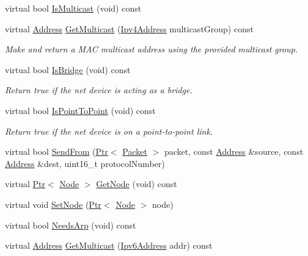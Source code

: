 \begin{DoxyCompactItemize}
virtual bool \hyperlink{classns3_1_1McUeNetDevice_a3459253818df16ee6af2ba49c28c525d}{Is\+Multicast} (void) const 
\item 
virtual \hyperlink{classns3_1_1Address}{Address} \hyperlink{classns3_1_1McUeNetDevice_a5f75b190a64d94f87f404367775e1373}{Get\+Multicast} (\hyperlink{classns3_1_1Ipv4Address}{Ipv4\+Address} multicast\+Group) const 
\begin{DoxyCompactList}\small\item\em Make and return a M\+AC multicast address using the provided multicast group. \end{DoxyCompactList}\item 
virtual bool \hyperlink{classns3_1_1McUeNetDevice_a333d93bc79e7c972dfb74ca88a7dd0ed}{Is\+Bridge} (void) const 
\begin{DoxyCompactList}\small\item\em Return true if the net device is acting as a bridge. \end{DoxyCompactList}\item 
virtual bool \hyperlink{classns3_1_1McUeNetDevice_acddc6d21bb11fbb47ea7b8ca0c627c71}{Is\+Point\+To\+Point} (void) const 
\begin{DoxyCompactList}\small\item\em Return true if the net device is on a point-\/to-\/point link. \end{DoxyCompactList}\item 
virtual bool \hyperlink{classns3_1_1McUeNetDevice_a77a8e0a5cc3e20cdf0c53899cbeef64b}{Send\+From} (\hyperlink{classns3_1_1Ptr}{Ptr}$<$ \hyperlink{classns3_1_1Packet}{Packet} $>$ packet, const \hyperlink{classns3_1_1Address}{Address} \&source, const \hyperlink{classns3_1_1Address}{Address} \&dest, uint16\+\_\+t protocol\+Number)
\item 
virtual \hyperlink{classns3_1_1Ptr}{Ptr}$<$ \hyperlink{classns3_1_1Node}{Node} $>$ \hyperlink{classns3_1_1McUeNetDevice_aa4cab784e7d5da58da159b06a33b4c2f}{Get\+Node} (void) const 
\item 
virtual void \hyperlink{classns3_1_1McUeNetDevice_a27fa782a8abcf69af465bb0138a0ae98}{Set\+Node} (\hyperlink{classns3_1_1Ptr}{Ptr}$<$ \hyperlink{classns3_1_1Node}{Node} $>$ node)
\item 
virtual bool \hyperlink{classns3_1_1McUeNetDevice_a2cadf2212f101a95aca7b801b6a20a33}{Needs\+Arp} (void) const 
\item 
virtual \hyperlink{classns3_1_1Address}{Address} \hyperlink{classns3_1_1McUeNetDevice_a160536271785368ec43ae0f0104c12a3}{Get\+Multicast} (\hyperlink{classns3_1_1Ipv6Address}{Ipv6\+Address} addr) const 

\end{DoxyCompactItemize}
